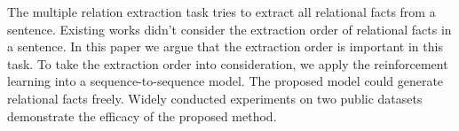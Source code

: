 The multiple relation extraction task tries to extract all relational facts from a sentence.
Existing works didn't consider the extraction order of relational facts in a sentence.
In this paper we argue that the extraction order is important in this task.
To take the extraction order into consideration, we apply the reinforcement learning into a sequence-to-sequence model. 
The proposed model could generate relational facts freely.
Widely conducted experiments on two public datasets demonstrate the efficacy of the proposed method.